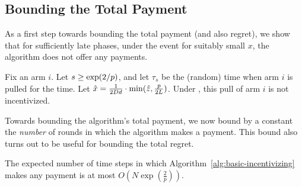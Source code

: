\subsection{Bounding the Total Payment}

As a first step towards bounding the total payment (and also regret),
we show that for sufficiently late phases,
under the event  for suitably small $x$,
the algorithm does not offer any payments.

\begin{lemma} \label{lem:no-incentives}
Fix an arm $i$.
Let $s \geq \exp(2/p)$, and let $\tau_s$ be the (random)
time when arm $i$ is pulled for the  time.
Let $\hat{x} = \frac{1}{2D d}
  \cdot \min(\hat{z}, \frac{p}{2L})$.
Under ,
this pull of arm $i$ is not incentivized.
\end{lemma}

Towards bounding the algorithm's total payment, we now bound by a
constant the \emph{number} of rounds in which the algorithm makes a
payment.
This bound also turns out to be useful for bounding the total regret.

\begin{lemma} \label{lem:numP}
The expected number of time steps in which
Algorithm~\ref{alg:basic-incentivizing}
makes any payment is at most $O\left( N\exp\left(\frac{2}{p}\right) \right)$.
\end{lemma}

